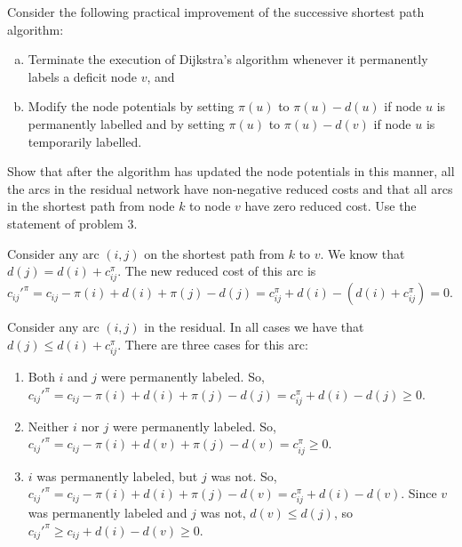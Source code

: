 \documentclass[fleqn]{homework}
\begin{document}
  \begin{problem}{7}
    \begin{question}
      Consider the following practical improvement of the successive shortest
      path algorithm:

      \begin{enumerate}[a.]
      \item Terminate the execution of Dijkstra's algorithm whenever it
        permanently labels a deficit node $v$, and

      \item Modify the node potentials by setting $\pi(u)$ to $\pi(u)-d(u)$ if
        node $u$ is permanently labelled and by setting $\pi(u)$ to
        $\pi(u)-d(v)$ if node $u$ is temporarily labelled.
      \end{enumerate}

      Show that after the algorithm has updated the node potentials in this
      manner, all the arcs in the residual network have non-negative reduced
      costs and that all arcs in the shortest path from node $k$ to node $v$
      have zero reduced cost. Use the statement of problem 3.
    \end{question}

    Consider any arc $(i,j)$ on the shortest path from $k$ to $v$.  We know that
    $d(j) = d(i) + c_{ij}^\pi $.  The new reduced cost of this arc is
    $c_{ij}'^\pi = c_{ij} - \pi(i) + d(i) + \pi(j) - d(j) = c_{ij}^\pi + d(i) -
    (d(i) + c_{ij}^\pi) = 0$.

    Consider any arc $(i,j)$ in the residual.  In all cases we have that
    $d(j) \le d(i) + c_{ij}^\pi$.  There are three cases for this arc:

    \begin{enumerate}[1.]
    \item Both $i$ and $j$ were permanently labeled.  So,
      $c_{ij}'^\pi = c_{ij} - \pi(i) + d(i) + \pi(j) - d(j) = c_{ij}^\pi + d(i)
      - d(j) \ge 0$.
    \item Neither $i$ nor $j$ were permanently labeled.  So,
      $c_{ij}'^\pi = c_{ij} - \pi(i) + d(v) + \pi(j) - d(v) = c_{ij}^\pi \ge 0$.
    \item $i$ was permanently labeled, but $j$ was not. So,
      $c_{ij}'^\pi = c_{ij} - \pi(i) + d(i) + \pi(j) - d(v) = c_{ij}^\pi + d(i)
      - d(v)$.
      Since $v$ was permanently labeled and $j$ was not, $d(v) \le d(j)$, so
      $c_{ij}'^\pi \ge c_{ij} + d(i) - d(v) \ge 0$.
    \end{enumerate}
  \end{problem}
\end{document}
